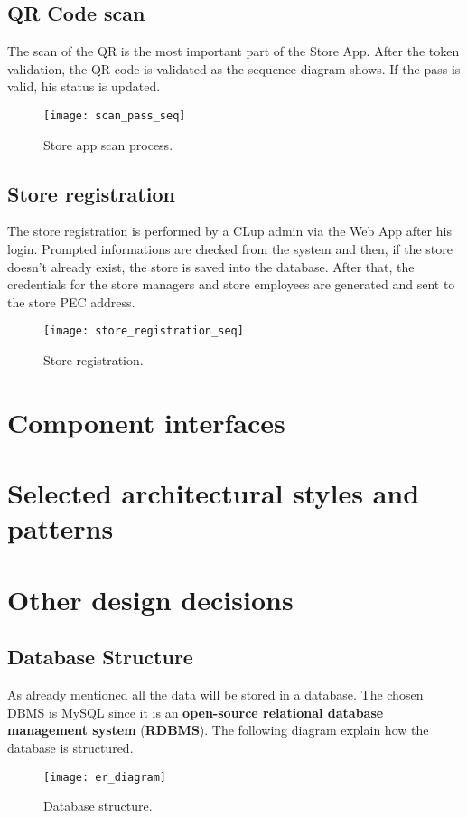 \subsection{QR Code scan}
The scan of the QR is the most important part of the Store App. After the token validation, the QR code is validated as the sequence diagram shows. If the pass is valid, his status is updated.
\begin{figure}[H]
	\centering
	\texttt{[image: scan\_pass\_seq]}
	\caption{Store app scan process.}
	\label{fig:scan_pass_seq}
\end{figure}

\subsection{Store registration}
The store registration is performed by a CLup admin via the Web App after his login. Prompted informations are checked from the system and then, if the store doesn't already exist, the store is saved into the database. After that, the credentials for the store managers and store employees are generated and sent to the store PEC address.
\begin{figure}[H]
	\centering
	\texttt{[image: store\_registration\_seq]}
	\caption{Store registration.}
	\label{fig:store_registration_seq}
\end{figure}

\section{Component interfaces}

\section{Selected architectural styles and patterns}

\clearpage

\section{Other design decisions}
\subsection{Database Structure}
As already mentioned all the data will be stored in a database. The chosen DBMS is MySQL since it is an \textbf{open-source relational database management system} (\textbf{RDBMS}).\newline
The following diagram explain how the database is structured. 
\begin{figure}[H]
	\centering
	\texttt{[image: er\_diagram]}
	\caption{Database structure.}
	\label{fig:er_diagram}
\end{figure}

